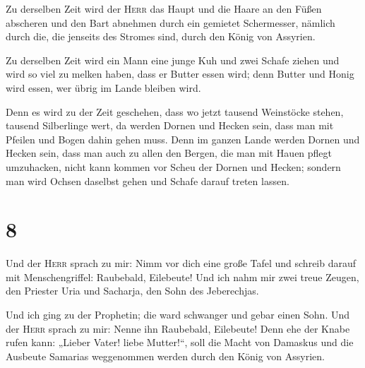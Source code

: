  Zu derselben Zeit wird der \textsc{Herr} das Haupt und
die Haare an den Füßen abscheren und den Bart abnehmen durch ein
gemietet Schermesser, nämlich durch die, die jenseits des Stromes sind,
durch den König von Assyrien.

 Zu derselben Zeit wird ein Mann eine junge Kuh und zwei
Schafe ziehen  und wird so viel zu melken haben, dass er
Butter essen wird; denn Butter und Honig wird essen, wer übrig im Lande
bleiben wird.

 Denn es wird zu der Zeit geschehen, dass wo jetzt
tausend Weinstöcke stehen, tausend Silberlinge wert, da werden Dornen
und Hecken sein,  dass man mit Pfeilen und Bogen dahin
gehen muss. Denn im ganzen Lande werden Dornen und Hecken sein,
 dass man auch zu allen den Bergen, die man mit Hauen
pflegt umzuhacken, nicht kann kommen vor Scheu der Dornen und Hecken;
sondern man wird Ochsen daselbst gehen und Schafe darauf treten lassen.

\hypertarget{section-7}{%
\section{8}\label{section-7}}

 Und der \textsc{Herr} sprach zu mir: Nimm vor dich eine
große Tafel und schreib darauf mit Menschengriffel: Raubebald,
Eilebeute!  Und ich nahm mir zwei treue Zeugen, den
Priester Uria und Sacharja, den Sohn des Jeberechjas.

 Und ich ging zu der Prophetin; die ward schwanger und
gebar einen Sohn. Und der \textsc{Herr} sprach zu mir: Nenne ihn
Raubebald, Eilebeute!  Denn ehe der Knabe rufen kann:
„Lieber Vater! liebe Mutter!{}``, soll die Macht von Damaskus und die
Ausbeute Samarias weggenommen werden durch den König von Assyrien.

